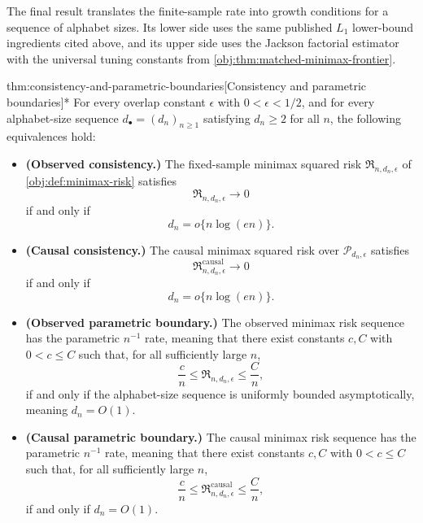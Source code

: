 \documentclass[11pt]{article}
\begin{document}
The final result translates the finite-sample rate into growth conditions for a sequence of alphabet sizes. Its lower side uses the same published \(L_1\) lower-bound ingredients cited above, and its upper side uses the Jackson factorial estimator with the universal tuning constants from \cref{obj:thm:matched-minimax-frontier}.

\begin{theoremv}{thm:consistency-and-parametric-boundaries}[Consistency and parametric boundaries]*
For every overlap constant \(\epsilon\) with \(0<\epsilon<1/2\), and for every alphabet-size sequence \(d_\bullet=(d_n)_{n\ge 1}\) satisfying \(d_n\ge 2\) for all \(n\), the following equivalences hold:
\begin{itemize}
\item \textbf{(Observed consistency.)} The fixed-sample minimax squared risk \(\mathfrak R_{n,d_n,\epsilon}\) of \cref{obj:def:minimax-risk} satisfies
\[
\mathfrak R_{n,d_n,\epsilon}\longrightarrow 0
\]
if and only if
\[
d_n=o\{n\log(en)\}.
\]
\item \textbf{(Causal consistency.)} The causal minimax squared risk over \(\mathcal P_{d_n,\epsilon}\) satisfies
\[
\mathfrak R^{\mathrm{causal}}_{n,d_n,\epsilon}\longrightarrow 0
\]
if and only if
\[
d_n=o\{n\log(en)\}.
\]
\item \textbf{(Observed parametric boundary.)} The observed minimax risk sequence has the parametric \(n^{-1}\) rate, meaning that there exist constants \(c,C\) with \(0<c\le C\) such that, for all sufficiently large \(n\),
\[
\frac{c}{n}\le \mathfrak R_{n,d_n,\epsilon}\le \frac{C}{n},
\]
if and only if the alphabet-size sequence is uniformly bounded asymptotically, meaning \(d_n=O(1)\).
\item \textbf{(Causal parametric boundary.)} The causal minimax risk sequence has the parametric \(n^{-1}\) rate, meaning that there exist constants \(c,C\) with \(0<c\le C\) such that, for all sufficiently large \(n\),
\[
\frac{c}{n}\le \mathfrak R^{\mathrm{causal}}_{n,d_n,\epsilon}\le \frac{C}{n},
\]
if and only if \(d_n=O(1)\).
\end{itemize}
\end{theoremv}
\end{document}
